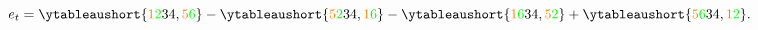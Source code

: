 \documentclass[crop,equation,convert={outext=.svg,command=\unexpanded{pdf2svg \infile\space\outfile}},multi=false]{standalone}
\begin{document}
\color{white}\Huge\boldmath
{} 
$e_t = \ytableaushort{{\color{orange}1}{\color{green}2}34,{\color{orange}5}{\color{green}6}}-\ytableaushort{{\color{orange}5}{\color{green}2}34,{\color{orange}1}{\color{green}6}}-\ytableaushort{{\color{orange}1}{\color{green}6}34,{\color{orange}5}{\color{green}2}}+\ytableaushort{{\color{orange}5}{\color{green}6}34,{\color{orange}1}{\color{green}2}}.$
\end{document}
